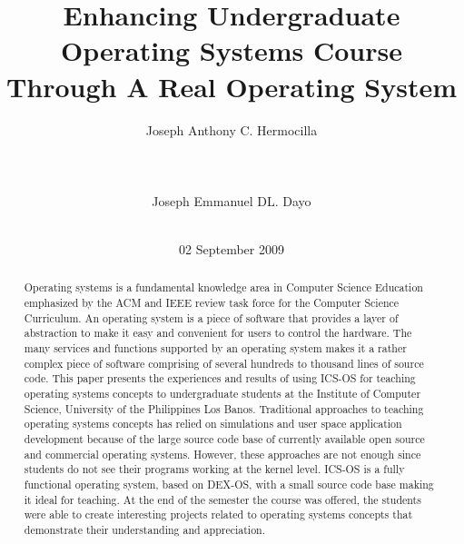 \documentclass{acm_proc_article-sp}
\begin{document}
\title{Enhancing Undergraduate Operating Systems Course Through 
A Real Operating System}

\author{
\alignauthor
Joseph Anthony C. Hermocilla\\
       \\
       \\
       \\
\alignauthor
Joseph Emmanuel DL. Dayo\\
       \\      
}
\date{02 September 2009}

\maketitle
\begin{abstract}
Operating systems is a fundamental knowledge area in Computer Science Education
emphasized by the ACM and IEEE review task force for the Computer Science 
Curriculum. An operating system is a piece of software that provides a layer 
of abstraction to make it easy and convenient for users to control the hardware.
The many services and functions supported by an operating system makes it a
rather complex piece of software comprising of several hundreds to thousand
lines of source code. This paper presents the experiences and results of using
ICS-OS for teaching operating systems concepts to undergraduate students at the
Institute of Computer Science, University of the Philippines Los Banos. 
Traditional approaches to teaching operating systems concepts has relied on 
simulations and user space application development because of the large source
code base of currently available open source and commercial operating systems.
However, these approaches are not enough since students do not see their 
programs working at the kernel level. ICS-OS is a fully functional operating 
system, based on DEX-OS, with a small source code base making it ideal for 
teaching. At the end of the semester the course was offered, the students were
able to create interesting projects related to operating systems concepts that
demonstrate their understanding and appreciation.
\end{abstract}

\end{document}
